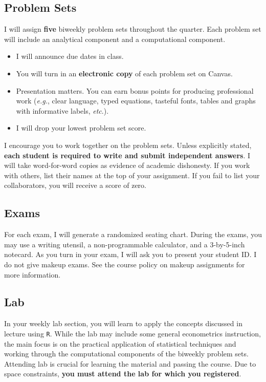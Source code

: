 \documentclass[10pt]{article}
\begin{document}
\subsection*{Problem Sets} 

I will assign \textbf{five} biweekly problem sets throughout the quarter. Each problem set will include an analytical component and a computational component. 
\begin{itemize}
	\setlength{\itemsep}{0pt}
	\item I will announce due dates in class. 
	\item You will turn in an \textbf{electronic copy} of each problem set on Canvas.
	\item Presentation matters. You can earn bonus points for producing professional work (\textit{e.g.}, clear language, typed equations, tasteful fonts, tables and graphs with informative labels, \textit{etc}.).
	\item I will drop your lowest problem set score.
\end{itemize}
I encourage you to work together on the problem sets. Unless explicitly stated, \textbf{each student is required to write and submit independent answers}. I will take word-for-word copies as evidence of academic dishonesty. If you work with others, list their names at the top of your assignment. If you fail to list your collaborators, you will receive a score of zero.

\subsection*{Exams} 

For each exam, I will generate a randomized seating chart. During the exams, you may use a writing utensil, a non-programmable calculator, and a 3-by-5-inch notecard. As you turn in your exam, I will ask you to present your student ID. I do not give makeup exams. See the course policy on makeup assignments for more information.  

\subsection*{Lab} 

In your weekly lab section, you will learn to apply the concepts discussed in lecture using \texttt{R}. While the lab may include some general econometrics instruction, the main focus is on the practical application of statistical techniques and working through the computational components of the biweekly problem sets. Attending lab is crucial for learning the material and passing the course. Due to space constraints, \textbf{you must attend the lab for which you registered}.
\end{document}
